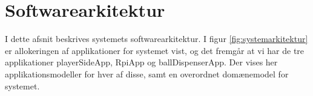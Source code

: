 \documentclass[Arkitektur/System_main.tex]{subfiles}
\begin{document}
\section{Softwarearkitektur} \label{sec:software_arkitektur}

I dette afsnit beskrives systemets softwarearkitektur. I figur \ref{fig:systemarkitektur} er allokeringen af applikationer for systemet vist, og det fremgår at vi har de tre applikationer playerSideApp, RpiApp og ballDispenserApp. Der vises her applikationsmodeller for hver af disse, samt en overordnet domænemodel for systemet.



\end{document}
